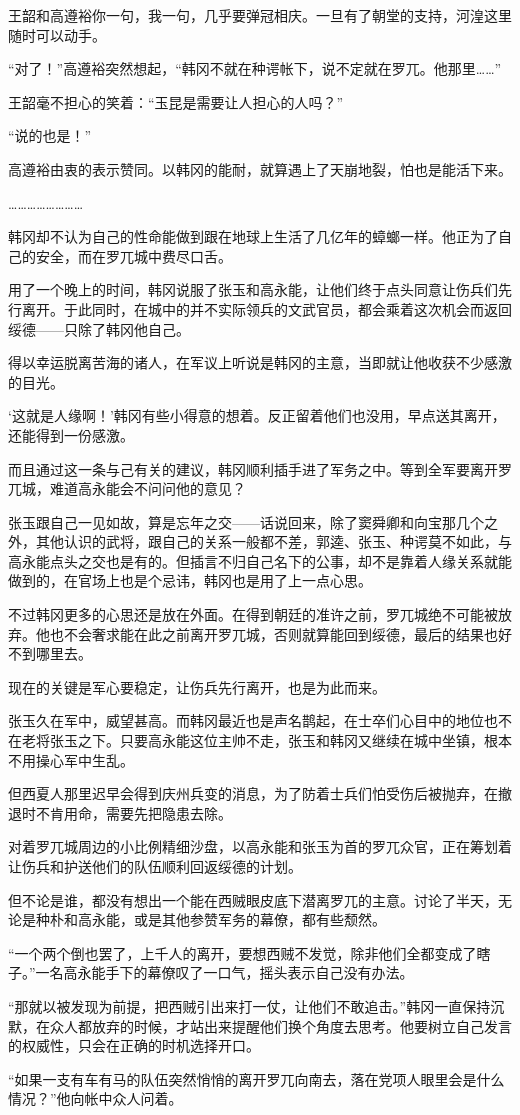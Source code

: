 王韶和高遵裕你一句，我一句，几乎要弹冠相庆。一旦有了朝堂的支持，河湟这里随时可以动手。

“对了！”高遵裕突然想起，“韩冈不就在种谔帐下，说不定就在罗兀。他那里……”

王韶毫不担心的笑着：“玉昆是需要让人担心的人吗？”

“说的也是！”

高遵裕由衷的表示赞同。以韩冈的能耐，就算遇上了天崩地裂，怕也是能活下来。

……………………

韩冈却不认为自己的性命能做到跟在地球上生活了几亿年的蟑螂一样。他正为了自己的安全，而在罗兀城中费尽口舌。

用了一个晚上的时间，韩冈说服了张玉和高永能，让他们终于点头同意让伤兵们先行离开。于此同时，在城中的并不实际领兵的文武官员，都会乘着这次机会而返回绥德——只除了韩冈他自己。

得以幸运脱离苦海的诸人，在军议上听说是韩冈的主意，当即就让他收获不少感激的目光。

‘这就是人缘啊！’韩冈有些小得意的想着。反正留着他们也没用，早点送其离开，还能得到一份感激。

而且通过这一条与己有关的建议，韩冈顺利插手进了军务之中。等到全军要离开罗兀城，难道高永能会不问问他的意见？

张玉跟自己一见如故，算是忘年之交——话说回来，除了窦舜卿和向宝那几个之外，其他认识的武将，跟自己的关系一般都不差，郭逵、张玉、种谔莫不如此，与高永能点头之交也是有的。但插言不归自己名下的公事，却不是靠着人缘关系就能做到的，在官场上也是个忌讳，韩冈也是用了上一点心思。

不过韩冈更多的心思还是放在外面。在得到朝廷的准许之前，罗兀城绝不可能被放弃。他也不会奢求能在此之前离开罗兀城，否则就算能回到绥德，最后的结果也好不到哪里去。

现在的关键是军心要稳定，让伤兵先行离开，也是为此而来。

张玉久在军中，威望甚高。而韩冈最近也是声名鹊起，在士卒们心目中的地位也不在老将张玉之下。只要高永能这位主帅不走，张玉和韩冈又继续在城中坐镇，根本不用操心军中生乱。

但西夏人那里迟早会得到庆州兵变的消息，为了防着士兵们怕受伤后被抛弃，在撤退时不肯用命，需要先把隐患去除。

对着罗兀城周边的小比例精细沙盘，以高永能和张玉为首的罗兀众官，正在筹划着让伤兵和护送他们的队伍顺利回返绥德的计划。

但不论是谁，都没有想出一个能在西贼眼皮底下潜离罗兀的主意。讨论了半天，无论是种朴和高永能，或是其他参赞军务的幕僚，都有些颓然。

“一个两个倒也罢了，上千人的离开，要想西贼不发觉，除非他们全都变成了瞎子。”一名高永能手下的幕僚叹了一口气，摇头表示自己没有办法。

“那就以被发现为前提，把西贼引出来打一仗，让他们不敢追击。”韩冈一直保持沉默，在众人都放弃的时候，才站出来提醒他们换个角度去思考。他要树立自己发言的权威性，只会在正确的时机选择开口。

“如果一支有车有马的队伍突然悄悄的离开罗兀向南去，落在党项人眼里会是什么情况？”他向帐中众人问着。

